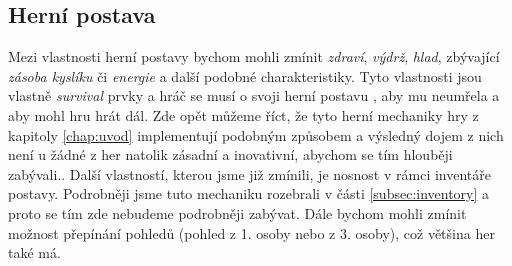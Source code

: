 \subsection{Herní postava}
Mezi vlastnosti herní postavy bychom mohli zmínit \textit{zdraví}, \textit{výdrž}, \textit{hlad}, zbývající \textit{zásoba kyslíku} či \textit{energie} a další podobné charakteristiky. Tyto vlastnosti jsou vlastně \textit{survival} prvky a hráč se musí o svoji herní postavu , aby mu neumřela a aby mohl hru hrát dál. Zde opět můžeme říct, že tyto herní mechaniky hry z kapitoly \ref{chap:uvod} implementují podobným způsobem a výsledný dojem z nich není u žádné z her natolik zásadní a inovativní, abychom se tím hlouběji zabývali..
Další vlastností, kterou jsme již zmínili, je nosnost v rámci inventáře postavy. Podrobněji jsme tuto mechaniku rozebrali v části \ref{subsec:inventory} a proto se tím zde nebudeme podrobněji zabývat. 
Dále bychom mohli zmínit možnost přepínání pohledů (pohled z 1. osoby nebo z 3. osoby), což většina her také má. 



